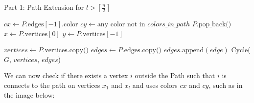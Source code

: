 \begin{algorithm}[H]
    \caption{Part 1: Path Extension for \( l > \left \lceil \frac{n}{2} \right \rceil \)}
    \begin{algorithmic}
            \State $cx \gets P.\text{edges}[-1].\text{color}$ 
            \State $cy \gets \text{any color not in } colors\_in\_path$ 
            \State $P.\text{pop\_back()}$ 
            \State $x \gets P.\text{vertices}[0]$ 
            \State $y \gets P.\text{vertices}[-1]$ 

                \State $vertices \gets P.\text{vertices.copy()}$
                \State $edges \gets P.\text{edges.copy()}$
                \State $edges.\text{append}(edge)$
                \State \Return Cycle($G$, $vertices$, $edges$) 
            \EndIf
        \EndFunction
    \end{algorithmic}
\end{algorithm}

We can now check if there exists a vertex $i$ outside the Path
such that $i$ is connects to the path on vertices $x_1$ and $x_l$
and uses colors $cx$ and $cy$, such as in the image below:


